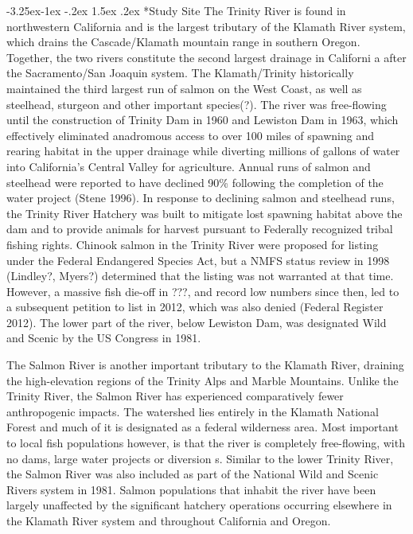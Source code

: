 \documentclass[twoside,10pt,twocolumn]{article}
\makeatletter
\renewcommand\subsection{\@startsection{subsection}{2}{\z@}%
                                     {-3.25ex\@plus -1ex \@minus -.2ex}%
                                     {1.5ex \@plus .2ex}%
                                     {\normalfont\normalsize\itshape}}
\makeatother
\begin{document}
\subsection*{Study Site}
The Trinity River is found in northwestern California and is the largest tributary of the Klamath River system, which drains the 
Cascade/Klamath mountain range in southern Oregon.  Together, the two rivers constitute the second largest drainage in Californi
a after the Sacramento/San Joaquin system. The Klamath/Trinity historically maintained the third largest run of salmon on the 
West Coast, as well as steelhead, sturgeon and other important species(?). The river was free-flowing until the construction of 
Trinity Dam in 1960 and Lewiston Dam in 1963, which effectively eliminated anadromous access to over 100 miles of spawning and 
rearing habitat in the upper drainage while diverting millions of gallons of water into California's Central Valley for 
agriculture. Annual runs of salmon and steelhead were reported to have declined 90\% following the completion of the water 
project (Stene 1996). In response to declining salmon and steelhead runs, the Trinity River Hatchery was built to mitigate lost 
spawning habitat above the dam and to provide animals for harvest pursuant to Federally recognized tribal fishing rights. 
Chinook salmon in the Trinity River were proposed for listing under the Federal Endangered Species Act, but a NMFS status review 
in 1998 (Lindley?, Myers?)  determined that the listing was not warranted at that time.  However, a massive fish die-off in ???, 
and record low numbers since then, led to a subsequent petition to list in 2012, which was also denied (Federal Register 2012). 
The lower part of the river, below Lewiston Dam, was designated Wild and Scenic by the US Congress in 1981.

The Salmon River is another important tributary to the Klamath River, draining the high-elevation regions of the Trinity Alps 
and Marble Mountains. Unlike the Trinity River, the Salmon River has experienced comparatively fewer anthropogenic impacts. The 
watershed lies entirely in the Klamath National Forest and much of it is designated as a federal wilderness area. Most important 
to local fish populations however, is that the river is completely free-flowing, with no dams, large water projects or diversion
s. Similar to the lower Trinity River, the Salmon River was also included as part of the National Wild and Scenic Rivers system 
in 1981. Salmon populations that inhabit the river have been largely unaffected by the significant hatchery operations occurring 
elsewhere in the Klamath River system and throughout California and Oregon.
\end{document}

